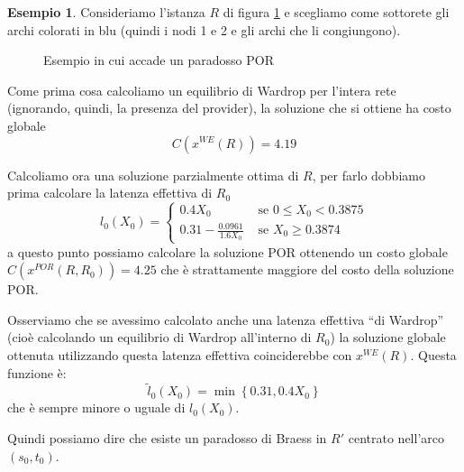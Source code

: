 \documentclass[a4paper]{article}
\newcounter{counter1}
\theoremstyle{plain}
\theoremstyle{definition}
\newtheorem{myes}[counter1]{Esempio}
\theoremstyle{remark}
\newcommand{\set}[1]{\left\{#1\right\}}
\newcommand{\pa}[1]{\left(#1\right)}
\begin{document}
\begin{myes}
  Consideriamo l'istanza $R$ di figura \ref{fig:paradosso-por} e
  scegliamo come sottorete gli archi colorati in blu (quindi i nodi 1
  e 2 e gli archi che li congiungono).

  \begin{figure}[ht]
    \centering
    \caption{Esempio in cui accade un paradosso POR}
    \label{fig:paradosso-por}
  \end{figure}

  Come prima cosa calcoliamo un equilibrio di Wardrop per l'intera
  rete (ignorando, quindi, la presenza del provider), la soluzione che
  si ottiene ha costo globale
  \[ C\pa{x^{WE}\pa{R}} = 4.19 \]
  
  Calcoliamo ora una soluzione parzialmente ottima di $R$, per farlo
  dobbiamo prima calcolare la latenza effettiva di $R_0$
  \[ l_0\pa{X_0} = \left\{
      \begin{matrix}
        0.4 X_0 & \text{ se } 0 \le X_0 < 0.3875 \\
        0.31 - \frac{0.0961}{1.6X_0} & \text{ se } X_0 \ge 0.3874
      \end{matrix} \right.
  \]
  a questo punto possiamo calcolare la soluzione POR ottenendo un
  costo globale $C\pa{x^{POR}\pa{R,R_0}} = 4.25$ che è strattamente
  maggiore del costo della soluzione POR.

  Osserviamo che se avessimo calcolato anche una latenza effettiva
  ``di Wardrop'' (cioè calcolando un equilibrio di Wardrop all'interno
  di $R_0$) la soluzione globale ottenuta utilizzando questa latenza
  effettiva coinciderebbe con $x^{WE}\pa{R}$. Questa funzione è:
  \[ \tilde l _0 \pa{X_0} = \min\set{0.31, 0.4X_0} \]
  che è sempre minore o uguale di $l_0\pa{X_0}$.

  Quindi possiamo dire che esiste un paradosso di Braess in $R'$
  centrato nell'arco $\pa{s_0,t_0}$.
\end{myes}
\end{document}
